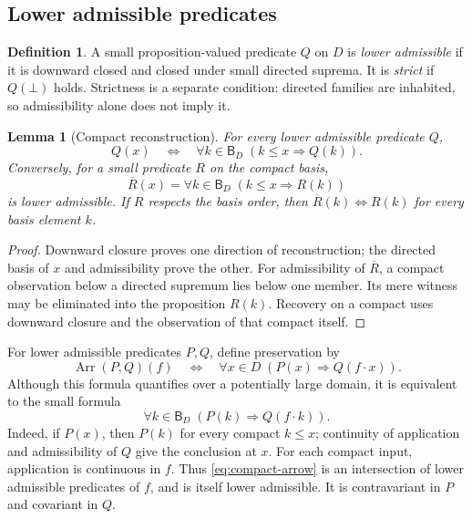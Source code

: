 \documentclass[11pt,a4paper]{article}
\newtheorem{lemma}[theorem]{Lemma}
\theoremstyle{definition}
\newtheorem{definition}[theorem]{Definition}
\theoremstyle{remark}
\newcommand{\B}{\mathsf B}
\newcommand{\appl}{\mathbin{\cdot}}
\begin{document}
\subsection{Lower admissible predicates}

\begin{definition}
A small proposition-valued predicate $Q$ on $D$ is \emph{lower admissible}
if it is downward closed and closed under small directed suprema.
It is \emph{strict} if $Q(\bot)$ holds. Strictness is a separate condition:
directed families are inhabited, so admissibility alone does not imply it.
\end{definition}

\begin{lemma}[Compact reconstruction]\label{lem:reconstruction}
For every lower admissible predicate $Q$,
\[
 Q(x)\quad\Longleftrightarrow\quad
 \forall k\in\B_D\;(k\leq x\Longrightarrow Q(k)).
\]
Conversely, for a small predicate $R$ on the compact basis,
\[
 \overline R(x)=\forall k\in\B_D\;(k\leq x\Longrightarrow R(k))
\]
is lower admissible. If $R$ respects the basis order, then
$\overline R(k)\Longleftrightarrow R(k)$ for every basis element $k$.
\end{lemma}
\begin{proof}
Downward closure proves one direction of reconstruction; the directed
basis of $x$ and admissibility prove the other. For admissibility of
$\overline R$, a compact observation below a directed supremum lies below
one member. Its mere witness may be eliminated into the proposition
$R(k)$. Recovery on a compact uses downward closure and the observation
of that compact itself.
\end{proof}

For lower admissible predicates $P,Q$, define preservation by
\[
 \operatorname{Arr}(P,Q)(f)
 \quad\Longleftrightarrow\quad
 \forall x\in D\;(P(x)\Longrightarrow Q(f\appl x)).
\]
Although this formula quantifies over a potentially large domain, it is
equivalent to the small formula
\begin{equation}\label{eq:compact-arrow}
 \forall k\in\B_D\;(P(k)\Longrightarrow Q(f\appl k)).
\end{equation}
Indeed, if $P(x)$, then $P(k)$ for every compact $k\leq x$; continuity
of application and admissibility of $Q$ give the conclusion at $x$.
For each compact input, application is continuous in $f$. Thus
\eqref{eq:compact-arrow} is an intersection of lower admissible predicates
of $f$, and is itself lower admissible. It is contravariant in $P$ and
covariant in $Q$.
\end{document}

